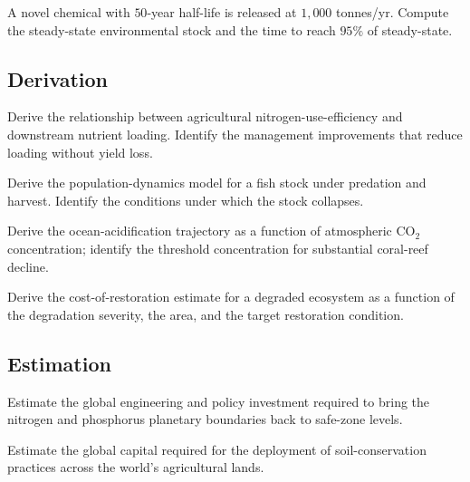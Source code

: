 \begin{exercise}
A novel chemical with $50$-year half-life is released at $1{,}000$ tonnes/yr. Compute the steady-state environmental stock and the time to reach $95\%$ of steady-state.
\end{exercise}

\subsection*{Derivation}

\begin{exercise}
Derive the relationship between agricultural nitrogen-use-efficiency and downstream nutrient loading. Identify the management improvements that reduce loading without yield loss.
\end{exercise}

\begin{exercise}
Derive the population-dynamics model for a fish stock under predation and harvest. Identify the conditions under which the stock collapses.
\end{exercise}

\begin{exercise}
Derive the ocean-acidification trajectory as a function of atmospheric CO$_2$ concentration; identify the threshold concentration for substantial coral-reef decline.
\end{exercise}

\begin{exercise}
Derive the cost-of-restoration estimate for a degraded ecosystem as a function of the degradation severity, the area, and the target restoration condition.
\end{exercise}

\subsection*{Estimation}

\begin{exercise}
Estimate the global engineering and policy investment required to bring the nitrogen and phosphorus planetary boundaries back to safe-zone levels.
\end{exercise}

\begin{exercise}
Estimate the global capital required for the deployment of soil-conservation practices across the world's agricultural lands.
\end{exercise}

